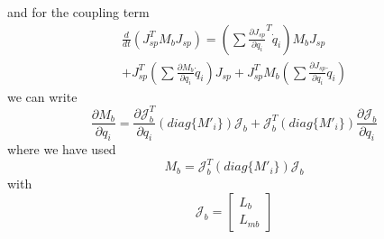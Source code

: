 \documentclass[lettersize,journal]{IEEEtran}
\begin{document}
and for the coupling term
\begin{multline}
    {\frac{d}{dt}(J_{sp}^TM_bJ_{sp})}=(\sum\frac{\partial J_{sp}}{\partial{q}_i}^T{}\dot{q}_i)M_bJ_{sp}\\
    +J_{sp}^T(\sum\frac{\partial M_b}{\partial{q}_i}\dot{q}_i)J_{sp}+ J_{sp}^TM_b(\sum\frac{\partial J_{sp}}{\partial{q}_i}\dot{q}_i)
\end{multline}
we can write
\begin{equation}
 \frac{\partial M_b}{\partial q_i}
=
\frac{\partial\mathcal{J}_b^T}{\partial q_i} (diag\{M'_i\})\mathcal{J}_b+\mathcal{J}_b^T(diag\{M'_i\})\frac{\partial \mathcal{J}_b}{\partial q_i}%
\end{equation}
where we have used
\begin{equation}
    M_b=\mathcal{J}_b^T(diag\{{M}'_i\})\mathcal{J}_b
\end{equation}
with
\begin{equation}
    \mathcal{J}_b=\begin{bmatrix}L_b \\ L_{mb}\end{bmatrix}
\end{equation}
\end{document}

